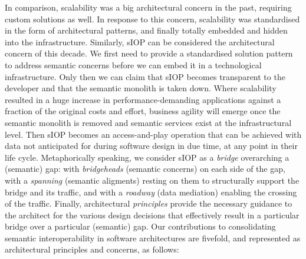 \documentclass[a4paper,11pt,oneside,oldfontcommands]{memoir}
\theoremstyle{definition}
\theoremstyle{break}		%
\numberwithin{equation}{chapter}
\numberwithin{figure}{chapter}
\begin{document}
In comparison, scalability was a big architectural concern in the past,
requiring custom solutions as well. In response to this concern,
scalability was standardised in the form of architectural patterns, and
finally totally embedded and hidden into the infrastructure. Similarly,
sIOP can be considered the architectural concern of this decade. We
first need to provide a standardised solution pattern to address
semantic concerns before we can embed it in a technological
infrastructure. Only then we can claim that sIOP becomes transparent to
the developer and that the semantic monolith is taken down. Where
scalability resulted in a huge increase in performance-demanding
applications against a fraction of the original costs and effort,
business agility will emerge once the semantic monolith is removed and
semantic services exist at the infrastructural level. Then sIOP becomes
an access-and-play operation that can be achieved with data not
anticipated for during software design in due time, at any point in
their life cycle. Metaphorically speaking, we consider sIOP as a
\emph{bridge} overarching a (semantic) gap: with \emph{bridgeheads}
(semantic concerns) on each side of the gap, with a \emph{spanning}
(semantic aligments) resting on them to structurally support the bridge
and its traffic, and with a \emph{roadway} (data mediation) enabling the
crossing of the traffic. Finally, architectural \emph{principles}
provide the necessary guidance to the architect for the various design
decisions that effectively result in a particular bridge over a
particular (semantic) gap. Our contributions to consolidating semantic
interoperability in software architectures are fivefold, and represented
as architectural principles and concerns, as follows:
\end{document}
